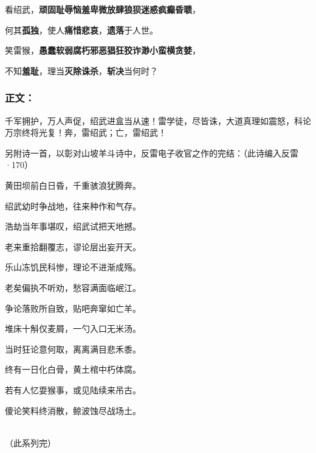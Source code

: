 \documentclass[UTF8,12pt,oneside]{ctexbook}
\begin{document}
    \songti

    \begin{center}

    \noindent 看绍武，\textbf{顽固耻辱恼羞卑微放肆狼狈迷惑疯癫昏聩}，
    
    何其\textbf{孤独}，使人\textbf{痛惜悲哀}，\textbf{遗落}于人世。

    \noindent 笑雷猴，\textbf{愚蠢软弱腐朽邪恶猖狂狡诈渺小蛮横贪婪}，
    
    不知\textbf{羞耻}，理当\textbf{灭除诛杀}，\textbf{斩决}当何时？

    \end{center}

    \subsection{正文：}
    \large
    千军拥护，万人声促，绍武进盒当从速！雷学徒，尽皆诛，大道真理如震怒，科论万宗终将光复！奔，雷绍武；亡，雷绍武！
    
    \newpage

    \kaishu
    另附诗一首，以彰对山坡羊斗诗中，反雷电子收官之作的完结：（此诗编入反雷·170）

    \songti
    \begin{center}
        \normalsize
        黄田坝前白日昏，千重骇浪犹腾奔。

        绍武幼时争战地，往来种作和气存。

        浩劫当年事堪叹，绍武试把天地撼。

        老来重拾翻覆志，谬论层出妄开天。

        乐山冻饥民科惨，理论不进渐成殇。

        老矣偏执不听劝，愁容满面临岷江。

        争论落败所自致，贴吧奔窜如亡羊。

        堆床十斛仅麦屑，一勺入口无米汤。

        当时狂论意何取，离离满目悲禾黍。

        终有一日化白骨，黄土棺中朽体腐。

        若有人忆耍猴事，或见陆续来吊古。

        傻论笑料终消散，鲸波蚀尽战场土。
    \end{center}

    \large
    ~\\

    \hfill{（此系列完）}

\chapter{}
\end{document}
